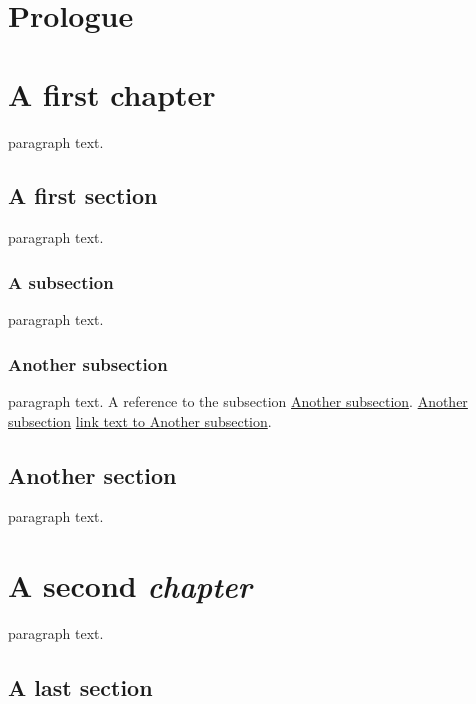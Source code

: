 \chapter*{Prologue}
\label{s:1}
\chapter{A first chapter}
\label{s:2}
\setcounter{tocdepth}{3}
\minitoc

paragraph text.

\section{A first section}
\label{s:3}
paragraph text.

\subsection{A subsection}
\label{s:4}
paragraph text.

\subsection{Another subsection}
\label{s:5}
paragraph text. A reference to the subsection
\hyperref[s:5]{Another subsection}.
\hyperref[s:5]{Another subsection}
\hyperref[s:5]{link text to Another subsection}.

\section{Another section}
\label{s:6}
paragraph text.

\chapter{A second \emph{chapter}}
\label{s:7}
paragraph text.

\section{A last section}
\label{s:8}
\setcounter{tocdepth}{3}
\tableofcontents
\setcounter{tocdepth}{0}
\tableofcontents
\setcounter{tocdepth}{3}
\tableofcontents
\setcounter{tocdepth}{3}
\tableofcontents
\setcounter{tocdepth}{3}
\minitoc
